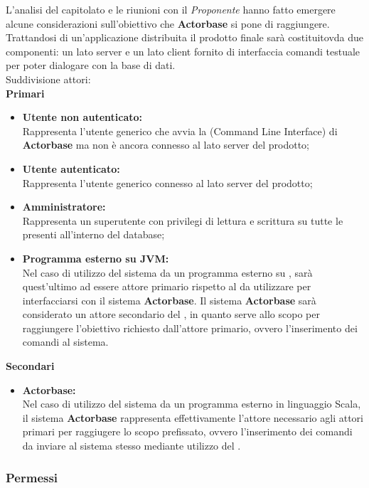 \documentclass{scalatekids-article}
\begin{document}
L'analisi del capitolato e le riunioni con il \textit{Proponente} hanno fatto emergere alcune considerazioni sull'obiettivo che \textbf{Actorbase} si pone di raggiungere.\\Trattandosi di un'applicazione distribuita il prodotto finale sarà costituitovda due  componenti: un lato server e un lato client fornito di interfaccia comandi testuale per poter dialogare con la base di dati.\\ Suddivisione attori:\\
\textbf{Primari}
\begin{itemize}
\item\textbf{Utente non autenticato:}\\
  Rappresenta l'utente generico che avvia la  (Command Line Interface) di \textbf{Actorbase} ma non è ancora connesso al lato server del prodotto;
\item\textbf{Utente autenticato:}\\
  Rappresenta l'utente generico connesso al lato server del prodotto;
\item\textbf{Amministratore:}\\
  Rappresenta un superutente con privilegi di lettura e scrittura su tutte le  presenti all'interno del database;
\item\textbf{Programma esterno su JVM:}\\
  Nel caso di utilizzo del sistema da un programma esterno su , sarà quest'ultimo ad essere attore primario rispetto al  da utilizzare per
  interfacciarsi con il sistema \textbf{Actorbase}. Il sistema \textbf{Actorbase} sarà considerato un attore secondario del , in quanto serve allo scopo
  per raggiungere l'obiettivo richiesto dall'attore primario, ovvero l'inserimento dei comandi al sistema.
\end{itemize}
\textbf{Secondari}
\begin{itemize}
\item\textbf{Actorbase:}\\
  Nel caso di utilizzo del sistema da un programma esterno in linguaggio Scala, il sistema \textbf{Actorbase} rappresenta effettivamente l'attore necessario agli attori primari per raggiugere
  lo scopo prefissato, ovvero l'inserimento dei comandi da inviare al sistema stesso mediante utilizzo del .
\end{itemize}

\subsubsection{Permessi}
\label{sec:permessi}
\end{document}

